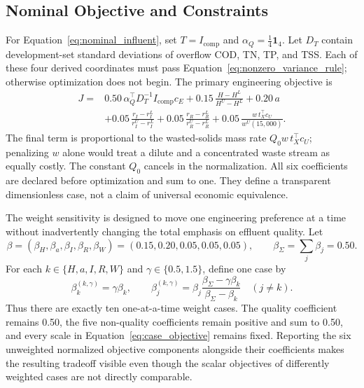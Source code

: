 \documentclass[a4paper,fleqn]{cas-sc}
\begin{document}
\subsection{Nominal Objective and Constraints}

For Equation~\eqref{eq:nominal_influent}, set $T=I_{\mathrm{comp}}$ and $\alpha_Q=\tfrac14\mathbf1_4$. Let $D_T$ contain development-set standard deviations of overflow COD, TN, TP, and TSS. Each of these four derived coordinates must pass Equation~\eqref{eq:nonzero_variance_rule}; otherwise optimization does not begin. The primary engineering objective is
\begin{equation}
\label{eq:case_objective}
\begin{split}
J={}&0.50\,\alpha_Q^\top D_T^{-1}I_{\mathrm{comp}}c_E
+0.15\,\frac{H-H^L}{H^U-H^L}
+0.20\,a\\
&+0.05\,\frac{r_I-r_I^L}{r_I^U-r_I^L}
+0.05\,\frac{r_R-r_R^L}{r_R^U-r_R^L}
+0.05\,\frac{w\,t_X^\top c_U}{w^U(15{,}000)}.
\end{split}
\end{equation}
The final term is proportional to the wasted-solids mass rate $Q_0w\,t_X^\top c_U$; penalizing $w$ alone would treat a dilute and a concentrated waste stream as equally costly. The constant $Q_0$ cancels in the normalization. All six coefficients are declared before optimization and sum to one. They define a transparent dimensionless case, not a claim of universal economic equivalence.

The weight sensitivity is designed to move one engineering preference at a time without inadvertently changing the total emphasis on effluent quality. Let
\begin{equation}
\beta=(\beta_H,\beta_a,\beta_I,\beta_R,\beta_W)
=(0.15,0.20,0.05,0.05,0.05),
\qquad \beta_\Sigma=\sum_j\beta_j=0.50.
\end{equation}
For each $k\in\{H,a,I,R,W\}$ and $\gamma\in\{0.5,1.5\}$, define one case by
\begin{equation}
\label{eq:weight_sensitivity}
\beta_k^{(k,\gamma)}=\gamma\beta_k,
\qquad
\beta_j^{(k,\gamma)}=\beta_j
\frac{\beta_\Sigma-\gamma\beta_k}{\beta_\Sigma-\beta_k}
\quad(j\ne k).
\end{equation}
Thus there are exactly ten one-at-a-time weight cases. The quality coefficient remains 0.50, the five non-quality coefficients remain positive and sum to 0.50, and every scale in Equation~\eqref{eq:case_objective} remains fixed. Reporting the six unweighted normalized objective components alongside their coefficients makes the resulting tradeoff visible even though the scalar objectives of differently weighted cases are not directly comparable.
\end{document}
